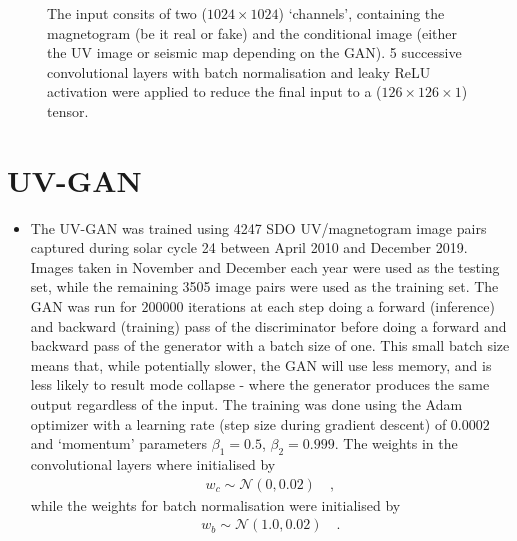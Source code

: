\documentclass[11pt,a4paper,onecolumn]{report}
\begin{document}
\begin{figure}[h]
  \centering
  \caption{
    The input consits of two ($1024\times 1024$) `channels', containing the
    magnetogram (be it real or fake) and the conditional image (either the UV
    image or seismic map depending on the GAN). 5 successive convolutional
    layers with batch normalisation and leaky ReLU activation were applied to
    reduce the final input to a ($126\times 126 \times 1$) tensor.
  }
  \label{fig:discrim_model}
\end{figure}



\section{UV-GAN}
\begin{itemize}
  \item The UV-GAN was trained using 4247 SDO UV/magnetogram image pairs
  captured during solar cycle 24 between April 2010 and December 2019. Images
  taken in November and December each year were used as the testing set, while
  the remaining 3505 image pairs were used as the training set. The GAN was run
  for $200000$ iterations at each step doing a forward (inference) and backward
  (training) pass of the discriminator before doing a forward and backward pass
  of the generator with a batch size of one. This small batch size means that,
  while potentially slower, the GAN will use less memory, and is less likely to
  result mode collapse - where the generator produces the same output regardless
  of the input. The training was done using the Adam optimizer
  \citep{kingma_adam_2014} with a learning rate (step size during gradient
  descent) of $0.0002$ and `momentum' parameters $\beta_1 = 0.5$, $\beta_2 =
  0.999$. The weights in the convolutional layers where initialised by
  \begin{align}
    w_c \sim \mathcal{N}\left(0, 0.02\right) \quad ,
  \end{align}
  while the weights for batch normalisation were initialised by
  \begin{align}
    w_b \sim \mathcal{N}\left(1.0, 0.02\right) \quad .
  \end{align}
  

\end{itemize}
\end{document}
